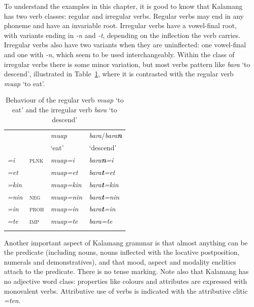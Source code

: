 \documentclass[output=paper,colorlinks,citecolor=brown,draft]{langscibook}
\begin{document}
To understand the examples in this chapter, it is good to know that Kalamang has two verb classes: regular and irregular verbs. Regular verbs may end in any phoneme and have an invariable root. Irregular verbs have a vowel-final root, with variants ending in \textit{-n} and \textit{-t}, depending on the inflection the verb carries. Irregular verbs also have two variants when they are uninflected: one vowel-final and one with \textit{-n}, which seem to be used interchangeably. Within the class of irregular verbs there is some minor variation, but most verbs pattern like \textit{bara} `to descend', illustrated in Table~\ref{tab:kal:verbcomp}, where it is contrasted with the regular verb \textit{muap} `to eat'.

\begin{table}[ht!]
\centering
	\caption{Behaviour of the regular verb \textit{muap} `to eat' and the irregular verb \textit{bara} `to descend'}
		\begin{tabular}{l l l l }
			\lsptoprule
			 && \textit{muap} & \textit{bara}/\textit{bara\textbf{n}}\\
			 && `eat' & `descend'\\ \midrule
			\textit{=i} & \textsc{plnk} & \textit{muap=i} & \textit{bara\textbf{n}=i}\\
			\textit{=et} & \glet & \textit{muap=et} & \textit{bara\textbf{t}=et} \\
			\textit{=kin} & \glkin  & \textit{muap=kin}& \textit{bara\textbf{t}=kin} \\
			\textit{=nin} & \textsc{neg} & \textit{muap=nin} & \textit{bara\textbf{t}=nin}\\
			\textit{=in} & \textsc{proh} & \textit{muap=in} & \textit{bara\textbf{t}=in}\\
			\textit{=te} & \textsc{imp} & \textit{muap=te} & \textit{bara=te}\\ 	\lspbottomrule
		\end{tabular}
	\label{tab:kal:verbcomp}
\end{table}

Another important aspect of Kalamang grammar is that almost anything can be the predicate (including nouns, nouns inflected with the locative postposition, numerals and demonstratives), and that mood, aspect and modality enclitics attach to the predicate. There is no tense marking. Note also that Kalamang has no adjective word class: properties like colours and attributes are expressed with monovalent verbs. Attributive use of verbs is indicated with the attributive clitic \textit{=ten}.
\end{document}
